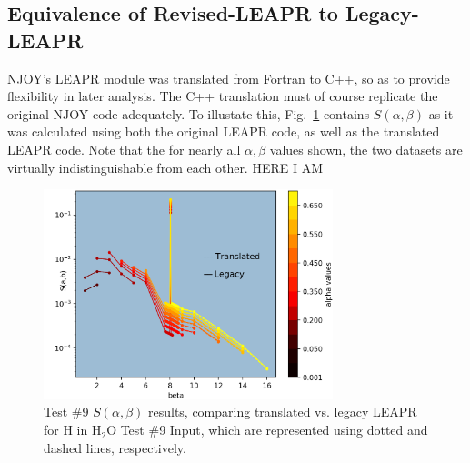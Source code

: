 \documentclass[Master.tex]{subfiles}
\begin{document}
  \subsection{Equivalence of Revised-LEAPR to Legacy-LEAPR}
    NJOY's LEAPR module was translated from Fortran to C++, so as to provide flexibility in later analysis. The C++ translation must of course replicate the original NJOY code adequately. To illustate this, Fig.~\ref{fig:me_vs_njoy_sab} contains $S(\alpha,\beta)$ as it was calculated using both the original LEAPR code, as well as the translated LEAPR code. Note that the for nearly all $\alpha,\beta$ values shown, the two datasets are virtually indistinguishable from each other. HERE I AM
    \begin{figure}[H]
      \begin{center}
        \includegraphics[width=0.75\textwidth]{images/me-vs-njoy-1b}
        \caption[Comparison of Translated vs. Legacy LEAPR, for Test \#9 ($S(\alpha,\beta)$)]{Test \#9 $S(\alpha,\beta)$ results, comparing translated vs. legacy LEAPR for H in H$_2$O Test \#9 Input, which are represented using dotted and dashed lines, respectively.}
        \label{fig:me_vs_njoy_sab}
      \end{center}
    \end{figure}
\end{document}
